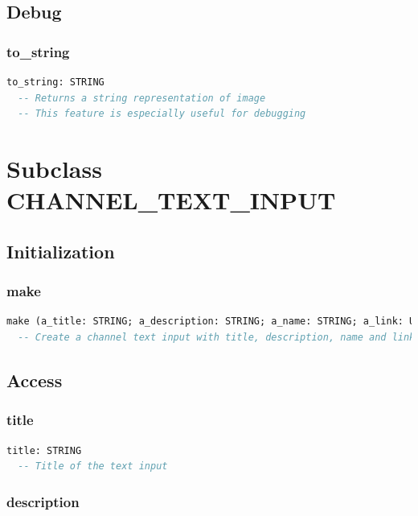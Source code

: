 \subsection{Debug}
\label{sec:channel-image-debug}

\subsubsection{to\_string}

\begin{lstlisting}[language=Eiffel]
to_string: STRING
  -- Returns a string representation of image
  -- This feature is especially useful for debugging
\end{lstlisting}

\section{Subclass CHANNEL\_TEXT\_INPUT}
\label{sec:channel-text-input}

\subsection{Initialization}
\label{sec:channel-text-input-initialization}

\subsubsection{make}

\begin{lstlisting}[language=Eiffel]
make (a_title: STRING; a_description: STRING; a_name: STRING; a_link: URL)
  -- Create a channel text input with title, description, name and link
\end{lstlisting}

\subsection{Access}
\label{sec:channel-text-input-access}

\subsubsection{title}

\begin{lstlisting}[language=Eiffel]
title: STRING
  -- Title of the text input
\end{lstlisting}

\subsubsection{description}

